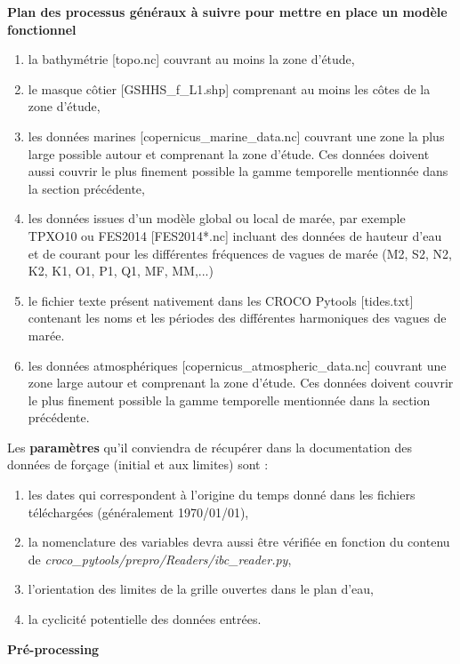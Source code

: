 \documentclass[10pt,a4paper,titlepage]{article}
\begin{document}
\begin{processEnv}{\textbf{Plan des processus généraux à suivre pour mettre en place un modèle fonctionnel}}
    \begin{enumerate}
        \item la bathymétrie {\color{darkgrey}[topo.nc]} couvrant au moins la zone d'étude,
        \item le masque côtier {\color{darkgrey}[GSHHS\_f\_L1.shp]} comprenant au moins les côtes de la zone d'étude,
        \item les données marines {\color{darkgrey}[copernicus\_marine\_data.nc]} couvrant une zone la plus large possible autour et comprenant la zone d'étude. Ces données doivent aussi couvrir le plus finement possible la gamme temporelle mentionnée dans la section précédente,
        \item les données issues d'un modèle global ou local de marée, par exemple TPXO10 ou FES2014 {\color{darkgrey}[FES2014*.nc]} incluant des données de hauteur d'eau et de courant pour les différentes fréquences de vagues de marée (M2, S2, N2, K2, K1, O1, P1, Q1, MF, MM,...)
        \item le fichier texte présent nativement dans les CROCO Pytools {\color{darkgrey}[tides.txt]} contenant les noms et les périodes des différentes harmoniques des vagues de marée.
        \item les données atmosphériques {\color{darkgrey}[copernicus\_atmospheric\_data.nc]} couvrant une zone large autour et comprenant la zone d'étude. Ces données doivent couvrir le plus finement possible la gamme temporelle mentionnée dans la section précédente.
    \end{enumerate}

    Les {\color{paramColor}\textbf{paramètres}} qu'il conviendra de récupérer dans la documentation des données de forçage (initial et aux limites) sont :

    \begin{enumerate}
        \item les dates qui correspondent à l'origine du temps donné dans les fichiers téléchargées (généralement 1970/01/01),
        \item la nomenclature des variables devra aussi être vérifiée en fonction du contenu de \textit{croco\_pytools/prepro/Readers/ibc\_reader.py},
        \item l'orientation des limites de la grille ouvertes dans le plan d'eau,
        \item la cyclicité potentielle des données entrées.
    \end{enumerate}

    {\color{workColor}\textbf{Pré-processing}}


\end{processEnv}
\end{document}
